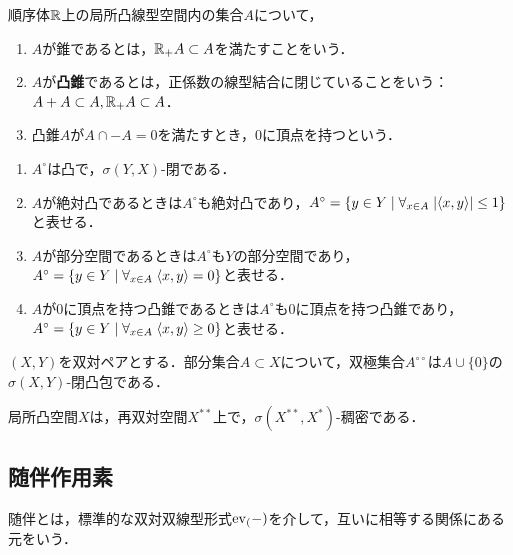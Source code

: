 \documentclass[uplatex,dvipdfmx]{jsreport}
\begin{document}
\begin{definition}
    順序体$\mathbb{R}$上の局所凸線型空間内の集合$A$について，
    \begin{enumerate}
        \item $A$が錐であるとは，$\mathbb{R}_+A\subset A$を満たすことをいう．
        \item $A$が\textbf{凸錐}であるとは，正係数の線型結合に閉じていることをいう：$A+A\subset A,\mathbb{R}_+A\subset A$．
        \item 凸錐$A$が$A\cap -A=0$を満たすとき，$0$に頂点を持つという．
    \end{enumerate}
\end{definition}

\begin{lemma}\mbox{}\label{lemma-polar}
    \begin{enumerate}
        \item $A^\circ$は凸で，$\sigma(Y,X)$-閉である．
        \item $A$が絶対凸であるときは$A^\circ$も絶対凸であり，$A^\circ=\left\{y\in Y\mid\forall_{x\in A}\;\lvert\langle x,y\rangle\rvert\le 1\right\}$と表せる．
        \item $A$が部分空間であるときは$A^\circ$も$Y$の部分空間であり，$A^\circ=\left\{y\in Y\mid\forall_{x\in A}\;\langle x,y\rangle=0\right\}$と表せる．
        \item $A$が$0$に頂点を持つ凸錐であるときは$A^\circ$も$0$に頂点を持つ凸錐であり，$A^\circ=\left\{y\in Y\mid\forall_{x\in A}\;\langle x,y\rangle\ge0\right\}$と表せる．
    \end{enumerate}
\end{lemma}

\begin{theorem}[双極定理]\label{thm-polar-theorem}
    $(X,Y)$を双対ペアとする．部分集合$A\subset X$について，双極集合$A^{\circ\circ}$は$A\cup\{0\}$の$\sigma(X,Y)$-閉凸包である．
\end{theorem}

\begin{corollary}
    局所凸空間$X$は，再双対空間$X^{**}$上で，$\sigma(X^{**},X^*)$-稠密である．
\end{corollary}

\subsection{随伴作用素}

\begin{tcolorbox}[colframe=ForestGreen, colback=ForestGreen!10!white,breakable,colbacktitle=ForestGreen!40!white,coltitle=black,fonttitle=\bfseries\sffamily,
title=]
    随伴とは，標準的な双対双線型形式$\mathrm{ev}_(-)$を介して，互いに相等する関係にある元をいう．
\end{tcolorbox}
\end{document}
